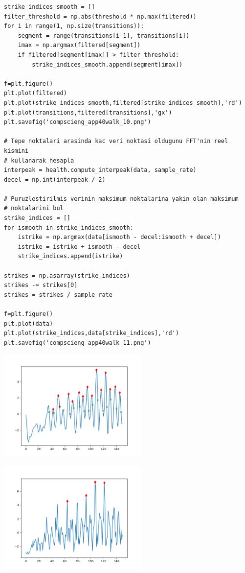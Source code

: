 \documentclass[12pt,fleqn]{article}\usepackage{../../common}
\begin{document}
\begin{verbatim}
strike_indices_smooth = []
filter_threshold = np.abs(threshold * np.max(filtered))
for i in range(1, np.size(transitions)):
    segment = range(transitions[i-1], transitions[i])
    imax = np.argmax(filtered[segment])
    if filtered[segment[imax]] > filter_threshold:
        strike_indices_smooth.append(segment[imax])

f=plt.figure()
plt.plot(filtered)
plt.plot(strike_indices_smooth,filtered[strike_indices_smooth],'rd')
plt.plot(transitions,filtered[transitions],'gx')
plt.savefig('compscieng_app40walk_10.png')

# Tepe noktalari arasinda kac veri noktasi oldugunu FFT'nin reel kismini 
# kullanarak hesapla
interpeak = health.compute_interpeak(data, sample_rate)
decel = np.int(interpeak / 2)

# Puruzlestirilmis verinin maksimum noktalarina yakin olan maksimum
# noktalarini bul
strike_indices = []
for ismooth in strike_indices_smooth:
    istrike = np.argmax(data[ismooth - decel:ismooth + decel])
    istrike = istrike + ismooth - decel
    strike_indices.append(istrike)

strikes = np.asarray(strike_indices)
strikes -= strikes[0]
strikes = strikes / sample_rate

f=plt.figure()
plt.plot(data)
plt.plot(strike_indices,data[strike_indices],'rd')
plt.savefig('compscieng_app40walk_11.png')
\end{verbatim}

\includegraphics[width=20em]{compscieng_app40walk_10.png}

\includegraphics[width=20em]{compscieng_app40walk_11.png}
\end{document}
